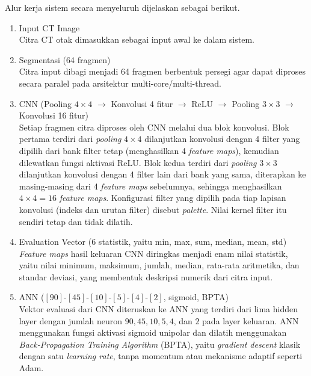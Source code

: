 Alur kerja sistem secara menyeluruh dijelaskan sebagai berikut.

\begin{enumerate}
	\item Input CT Image\\
	Citra CT otak dimasukkan sebagai input awal ke dalam sistem.
	
	\item Segmentasi (64 fragmen)\\
	Citra input dibagi menjadi 64 fragmen berbentuk persegi agar dapat diproses secara paralel pada arsitektur multi-core/multi-thread.
	
	\item CNN (Pooling $4\times4$ $\rightarrow$ Konvolusi 4 fitur $\rightarrow$ ReLU $\rightarrow$ Pooling $3\times3$ $\rightarrow$ Konvolusi 16 fitur)\\
	Setiap fragmen citra diproses oleh CNN melalui dua blok konvolusi. Blok pertama terdiri dari \textit{pooling} $4\times4$ dilanjutkan konvolusi dengan 4 filter yang dipilih dari bank filter tetap (menghasilkan 4 \textit{feature maps}), kemudian dilewatkan fungsi aktivasi ReLU. Blok kedua terdiri dari \textit{pooling} $3\times3$ dilanjutkan konvolusi dengan 4 filter lain dari bank yang sama, diterapkan ke masing-masing dari 4 \textit{feature maps} sebelumnya, sehingga menghasilkan $4\times4=16$ \textit{feature maps}. Konfigurasi filter yang dipilih pada tiap lapisan konvolusi (indeks dan urutan filter) disebut \textit{palette}. Nilai kernel filter itu sendiri tetap dan tidak dilatih.
	
	\item Evaluation Vector (6 statistik, yaitu min, max, sum, median, mean, std)\\
	\textit{Feature maps} hasil keluaran CNN diringkas menjadi enam nilai statistik, yaitu nilai minimum, maksimum, jumlah, median, rata-rata aritmetika, dan standar deviasi, yang membentuk deskripsi numerik dari citra input.
	
	\item ANN ($[90]\text{-}[45]\text{-}[10]\text{-}[5]\text{-}[4]\text{-}[2]$, sigmoid, BPTA)\\
	Vektor evaluasi dari CNN diteruskan ke ANN yang terdiri dari lima hidden layer dengan jumlah neuron $90, 45, 10, 5, 4$, dan $2$ pada layer keluaran. ANN menggunakan fungsi aktivasi sigmoid unipolar dan dilatih menggunakan \textit{Back-Propagation Training Algorithm} (BPTA), yaitu \textit{gradient descent} klasik dengan satu \textit{learning rate}, tanpa momentum atau mekanisme adaptif seperti Adam.
	

\end{enumerate}
